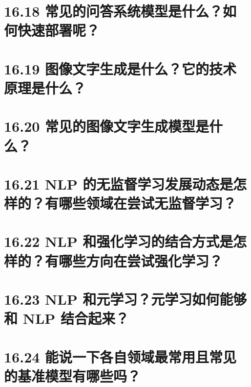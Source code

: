\section{16.18
常见的问答系统模型是什么？如何快速部署呢？}\label{ux5e38ux89c1ux7684ux95eeux7b54ux7cfbux7edfux6a21ux578bux662fux4ec0ux4e48ux5982ux4f55ux5febux901fux90e8ux7f72ux5462}

\section{16.19
图像文字生成是什么？它的技术原理是什么？}\label{ux56feux50cfux6587ux5b57ux751fux6210ux662fux4ec0ux4e48ux5b83ux7684ux6280ux672fux539fux7406ux662fux4ec0ux4e48}

\section{16.20
常见的图像文字生成模型是什么？}\label{ux5e38ux89c1ux7684ux56feux50cfux6587ux5b57ux751fux6210ux6a21ux578bux662fux4ec0ux4e48}

\section{16.21 NLP
的无监督学习发展动态是怎样的？有哪些领域在尝试无监督学习？}\label{nlp-ux7684ux65e0ux76d1ux7763ux5b66ux4e60ux53d1ux5c55ux52a8ux6001ux662fux600eux6837ux7684ux6709ux54eaux4e9bux9886ux57dfux5728ux5c1dux8bd5ux65e0ux76d1ux7763ux5b66ux4e60}

\section{16.22 NLP
和强化学习的结合方式是怎样的？有哪些方向在尝试强化学习？}\label{nlp-ux548cux5f3aux5316ux5b66ux4e60ux7684ux7ed3ux5408ux65b9ux5f0fux662fux600eux6837ux7684ux6709ux54eaux4e9bux65b9ux5411ux5728ux5c1dux8bd5ux5f3aux5316ux5b66ux4e60}

\section{16.23 NLP 和元学习？元学习如何能够和 NLP
结合起来？}\label{nlp-ux548cux5143ux5b66ux4e60ux5143ux5b66ux4e60ux5982ux4f55ux80fdux591fux548c-nlp-ux7ed3ux5408ux8d77ux6765}

\section{16.24
能说一下各自领域最常用且常见的基准模型有哪些吗？}\label{ux80fdux8bf4ux4e00ux4e0bux5404ux81eaux9886ux57dfux6700ux5e38ux7528ux4e14ux5e38ux89c1ux7684ux57faux51c6ux6a21ux578bux6709ux54eaux4e9bux5417}
